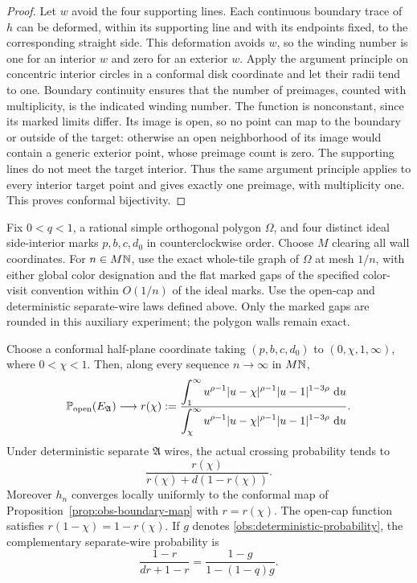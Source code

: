 \begin{proof}
Let $w$ avoid the four supporting lines.  Each continuous boundary
trace of $h$ can be deformed, within its supporting line and with
its endpoints fixed, to the corresponding straight side.  This
deformation avoids $w$, so the winding number is one for an
interior $w$ and zero for an exterior $w$.  Apply the argument
principle on concentric interior circles in a conformal disk
coordinate and let their radii tend to one.  Boundary continuity
ensures that the number of preimages, counted with multiplicity,
is the indicated winding number.  The function is nonconstant,
since its marked limits differ.  Its image is open, so no point
can map to the boundary or outside of the target: otherwise an
open neighborhood of its image would contain a generic exterior
point, whose preimage count is zero.  The supporting lines do not
meet the target interior.  Thus the same argument principle
applies to every interior target point and gives exactly one
preimage, with multiplicity one.  This proves conformal bijectivity.
\end{proof}

\begin{theorem}
\label{thm:fixed-polygon}
Fix $0<q<1$, a rational simple orthogonal polygon $\Omega$, and
four distinct ideal side-interior marks $p,b,c,d_0$ in
counterclockwise order.  Choose $M$ clearing all wall coordinates.
For $n\in M\mathbb N$, use the exact whole-tile graph of $\Omega$ at mesh
$1/n$, with either global color designation and the flat marked
gaps of the specified color-visit convention within $O(1/n)$ of
the ideal marks.  Use the open-cap and deterministic separate-wire
laws defined above.  Only the marked gaps are rounded in this
auxiliary experiment; the polygon walls remain exact.

Choose a conformal half-plane coordinate taking $(p,b,c,d_0)$ to
$(0,\chi,1,\infty)$, where $0<\chi<1$.  Then, along every sequence
$n\to\infty$ in $M\mathbb N$,
\begin{equation}
 \mathbb P_{\rm open}(E_{\mathfrak A})\longrightarrow
 r(\chi):=
 \frac{\displaystyle\int_1^\infty
    u^{\rho-1}|u-\chi|^{\rho-1}|u-1|^{1-3\rho}\,\,\mathrm d u}
 {\displaystyle\int_\chi^\infty
    u^{\rho-1}|u-\chi|^{\rho-1}|u-1|^{1-3\rho}\,\,\mathrm d u}.
 \label{obs:crossing-formula}
\end{equation}
Under deterministic separate $\mathfrak A$ wires, the actual
crossing probability tends to
\begin{equation}
 \frac{r(\chi)}{r(\chi)+d(1-r(\chi))}.
 \label{obs:deterministic-probability}
\end{equation}
Moreover $h_n$ converges locally uniformly to the conformal map
of Proposition~\ref{prop:obs-boundary-map} with $r=r(\chi)$.
The open-cap function satisfies $r(1-\chi)=1-r(\chi)$.  If $g$
denotes \eqref{obs:deterministic-probability}, the complementary
separate-wire probability is
\begin{equation}
 \frac{1-r}{dr+1-r}=\frac{1-g}{1-(1-q)g}.
 \label{obs:complementary-probability}
\end{equation}
\end{theorem}

